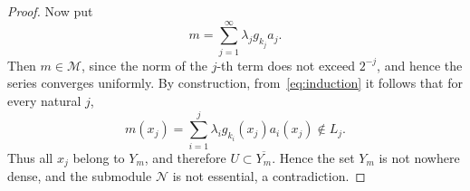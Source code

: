 \documentclass[10pt,a4paper]{amsart}
\newcommand{\M}{\mathcal M}
\newcommand{\N}{\mathcal N}
\begin{document}
\begin{proof}
		Now put
		\[ m = \sum_{j=1}^\infty \lambda_j g_{k_j}a_j. \]
		Then $m \in \M$, since the norm of the $j$-th term does not exceed $2^{-j}$, and hence the series converges uniformly.
		By construction, from~\eqref{eq:induction} it follows that for every natural $j$,
		\[ m(x_j) = \sum_{i=1}^j\lambda_ig_{k_i}(x_j)a_i(x_j) \notin L_j. \]
		Thus all $x_j$ belong to $Y_m$, and therefore $U \subset \overline{Y_m}$.
		Hence the set $Y_m$ is not nowhere dense, and the submodule $\N$ is not essential, a contradiction.
	\end{proof}
\end{document}
